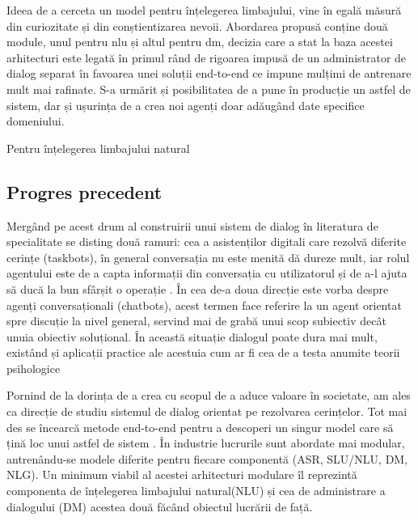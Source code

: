 Ideea de a cerceta un model pentru înțelegerea limbajului, vine în egală măsură din curiozitate și din conștientizarea nevoii. Abordarea propusă conține două module, unul pentru nlu și altul pentru dm, decizia care a stat la baza acestei arhitecturi este legată în primul rând de rigoarea impusă de un administrator de dialog separat în favoarea unei soluții end-to-end ce impune mulțimi de antrenare mult mai rafinate. S-a urmărit și posibilitatea de a pune în producție un astfel de sistem, dar și ușurința de a crea noi agenți doar adăugând date specifice domeniului.

Pentru înțelegerea limbajului natural


\subsection{Progres precedent}
Mergând pe acest drum al construirii unui sistem de dialog în literatura de specialitate se disting două ramuri: cea a asistenților digitali care rezolvă diferite cerințe (taskbots), în general conversația nu este menită dă dureze mult, iar rolul agentului este de a capta informații din conversația cu utilizatorul și de a-l ajuta să ducă la bun sfârșit o operație \cite{joint_online_bing, att_joint_bing}. În cea de-a doua direcție este vorba despre agenți conversaționali (chatbots), acest termen face referire la un agent orientat spre discuție la nivel general, servind mai de grabă unui scop subiectiv decât unuia obiectiv soluțional. În această situație dialogul poate dura mai mult, existând și aplicații practice ale acestuia cum ar fi cea de a testa anumite teorii psihologice \cite{weizenbaum}

Pornind de la dorința de a crea cu scopul de a aduce valoare în societate, am ales ca direcție de studiu sistemul de dialog orientat pe rezolvarea cerințelor. Tot mai des se încearcă metode end-to-end pentru a descoperi un singur model care să țină loc unui astfel de sistem \cite{end-to-end foal oriented}. În industrie lucrurile sunt abordate mai modular, antrenându-se modele diferite pentru fiecare componentă (ASR, SLU/NLU, DM, NLG). Un minimum viabil al acestei arhitecturi modulare îl reprezintă componenta de înțelegerea limbajului natural(NLU) și cea de administrare a dialogului (DM) acestea două făcând obiectul lucrării de față.

